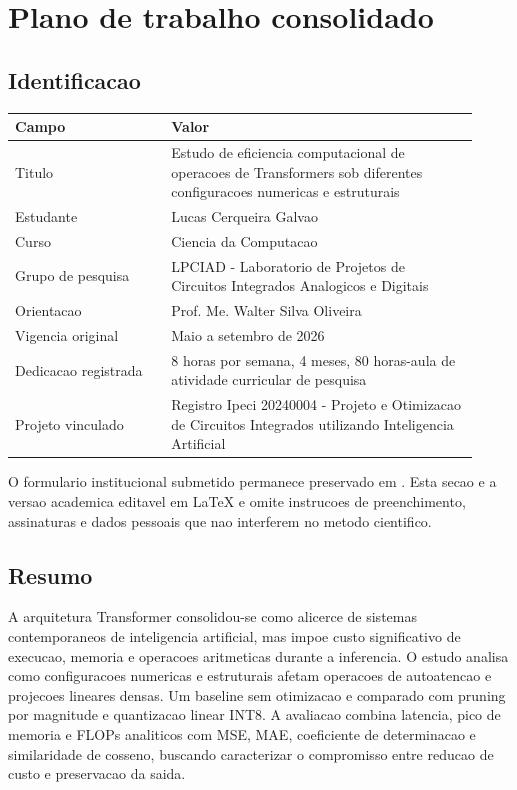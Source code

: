 \chapter{Plano de trabalho consolidado}

\section{Identificacao}

\begin{longtable}{@{}p{0.31\linewidth}p{0.61\linewidth}@{}}
\toprule
\textbf{Campo} & \textbf{Valor} \\
\midrule
Titulo & Estudo de eficiencia computacional de operacoes de Transformers sob diferentes configuracoes numericas e estruturais \\
Estudante & Lucas Cerqueira Galvao \\
Curso & Ciencia da Computacao \\
Grupo de pesquisa & LPCIAD - Laboratorio de Projetos de Circuitos Integrados Analogicos e Digitais \\
Orientacao & Prof. Me. Walter Silva Oliveira \\
Vigencia original & Maio a setembro de 2026 \\
Dedicacao registrada & 8 horas por semana, 4 meses, 80 horas-aula de atividade curricular de pesquisa \\
Projeto vinculado & Registro Ipeci 20240004 - Projeto e Otimizacao de Circuitos Integrados utilizando Inteligencia Artificial \\
\bottomrule
\end{longtable}

O formulario institucional submetido permanece preservado em
. Esta secao e
a versao academica editavel em LaTeX e omite instrucoes de preenchimento,
assinaturas e dados pessoais que nao interferem no metodo cientifico.

\section{Resumo}

A arquitetura Transformer consolidou-se como alicerce de sistemas contemporaneos
de inteligencia artificial, mas impoe custo significativo de execucao, memoria e
operacoes aritmeticas durante a inferencia. O estudo analisa como configuracoes
numericas e estruturais afetam operacoes de autoatencao e projecoes lineares
densas. Um baseline sem otimizacao e comparado com pruning por magnitude e
quantizacao linear INT8. A avaliacao combina latencia, pico de memoria e FLOPs
analiticos com MSE, MAE, coeficiente de determinacao e similaridade de cosseno,
buscando caracterizar o compromisso entre reducao de custo e preservacao da
saida.


